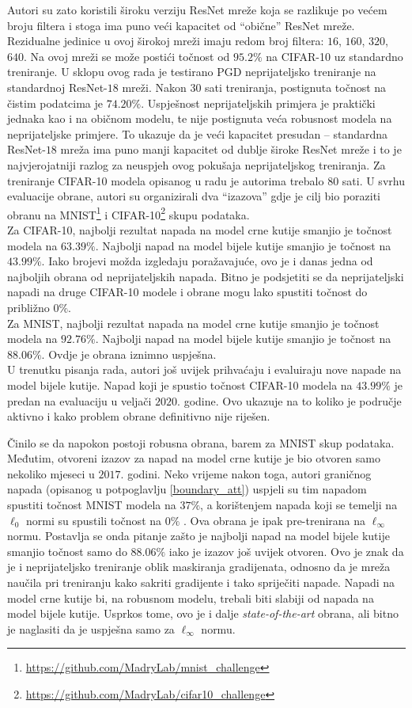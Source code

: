 \documentclass[utf8, diplomski]{fer}
\begin{document}
Autori su zato koristili široku verziju ResNet mreže koja se razlikuje po većem broju filtera i stoga ima puno veći kapacitet od ``obične'' ResNet mreže. Rezidualne jedinice u ovoj širokoj mreži imaju redom broj filtera: $16$, $160$, $320$, $640$. Na ovoj mreži se može postići točnost od $95.2\%$ na CIFAR-10 uz standardno treniranje. U sklopu ovog rada je testirano PGD neprijateljsko treniranje na standardnoj ResNet-$18$ mreži. Nakon $30$ sati treniranja, postignuta točnost na čistim podatcima je $74.20\%$. Uspješnost neprijateljskih primjera je praktički jednaka kao i na običnom modelu, te nije postignuta veća robusnost modela na neprijateljske primjere. To ukazuje da je veći kapacitet presudan -- standardna ResNet-$18$ mreža ima puno manji kapacitet od dublje široke ResNet mreže i to je najvjerojatniji razlog za neuspjeh ovog pokušaja neprijateljskog treniranja. Za treniranje CIFAR-10 modela opisanog u radu je autorima trebalo $80$ sati. U svrhu evaluacije obrane, autori su organizirali dva ``izazova'' gdje je cilj bio poraziti obranu na MNIST\footnote{\url{https://github.com/MadryLab/mnist_challenge}} i CIFAR-10\footnote{\url{https://github.com/MadryLab/cifar10_challenge}} skupu podataka. 
\\
Za CIFAR-10, najbolji rezultat napada na model crne kutije smanjio je točnost modela na $63.39\%$. Najbolji napad na model bijele kutije smanjio je točnost na $43.99\%$. Iako brojevi možda izgledaju poražavajuće, ovo je i danas jedna od najboljih obrana od neprijateljskih napada. Bitno je podsjetiti se da neprijateljski napadi na druge CIFAR-10 modele i obrane mogu lako spustiti točnost do približno $0\%$.
\\
Za MNIST, najbolji rezultat napada na model crne kutije smanjio je točnost modela na $92.76\%$. Najbolji napad na model bijele kutije smanjio je točnost na $88.06\%$. Ovdje je obrana iznimno uspješna. \\
U trenutku pisanja rada, autori još uvijek prihvaćaju i evaluiraju nove napade na model bijele kutije. Napad koji je spustio točnost CIFAR-10 modela na $43.99\%$ je predan na evaluaciju u veljači $2020.$ godine. Ovo ukazuje na to koliko je područje aktivno i kako problem obrane definitivno nije riješen.
\par
Činilo se da napokon postoji robusna obrana, barem za MNIST skup podataka. Međutim, otvoreni izazov za napad na model crne kutije je bio otvoren samo nekoliko mjeseci u $2017.$ godini. Neko vrijeme nakon toga, autori graničnog napada (opisanog u potpoglavlju \ref{boundary_att}) uspjeli su tim napadom spustiti točnost MNIST modela na $37\%$, a korištenjem napada koji se temelji na $\ell_{0}$ normi su spustili točnost na $0\%$ \citep{towards_mnist}. Ova obrana je ipak pre-trenirana na $\ell_{\infty}$ normu. Postavlja se onda pitanje zašto je najbolji napad na model bijele kutije smanjio točnost samo do $88.06\%$ iako je izazov još uvijek otvoren. Ovo je znak da je i neprijateljsko treniranje oblik maskiranja gradijenata, odnosno da je mreža naučila pri treniranju kako sakriti gradijente i tako spriječiti napade. Napadi na model crne kutije bi, na robusnom modelu, trebali biti slabiji od napada na model bijele kutije. Usprkos tome, ovo je i dalje \textit{state-of-the-art} obrana, ali bitno je naglasiti da je uspješna samo za $\ell_{\infty}$ normu.
\pagebreak
\end{document}
